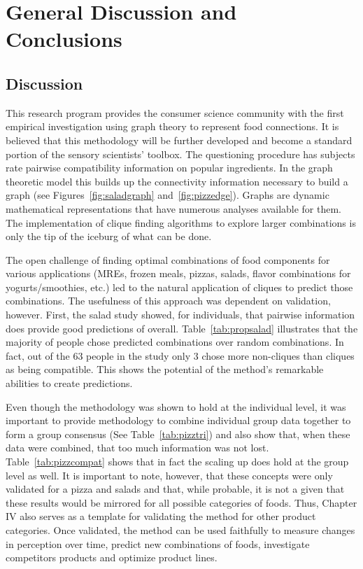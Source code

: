\chapter{General Discussion and Conclusions}
\section{Discussion}
This research program provides the consumer science community with the first empirical investigation using graph theory to represent food connections.  It is believed that this methodology will be further developed and become a standard portion of the sensory scientists’ toolbox. 
The questioning procedure has subjects rate pairwise compatibility information on popular ingredients.  In the graph theoretic model this builds up the connectivity information necessary to build a graph (see Figures~\ref{fig:saladgraph} and~\ref{fig:pizzedge}).  Graphs are dynamic mathematical representations that have numerous analyses available for them.  The implementation of clique finding algorithms to explore larger combinations is only the tip of the iceburg of what can be done.  

The open challenge of finding optimal combinations of food components for various applications (MREs\tm, frozen meals, pizzas, salads, flavor combinations for yogurts/smoothies, etc.) led to the natural application of cliques to predict those combinations.  The usefulness of this approach was dependent on validation, however.  First, the salad study showed, for individuals, that pairwise information does provide good predictions of overall.  Table~\ref{tab:propsalad} illustrates that the majority of people chose predicted combinations over random combinations.  In fact, out of the 63 people in the study only 3 chose more non-cliques than cliques as being compatible.  This shows the potential of the method's remarkable abilities to create predictions.  

Even though the methodology was shown to hold at the individual level, it was important to provide methodology to combine individual group data together to form a group consensus (See Table~\ref{tab:pizztri}) and also show that, when these data were combined, that too much information was not lost.  Table~\ref{tab:pizzcompat} shows that in fact the scaling up does hold at the group level as well.  It is important to note, however, that these concepts were only validated for a pizza and salads and that, while probable, it is not a given that these results would be mirrored for all possible categories of foods.  Thus, Chapter IV also serves as a template for validating the method for other product categories.  Once validated, the method can be used faithfully to measure changes in perception over time, predict new combinations of foods, investigate competitors products and optimize product lines.


